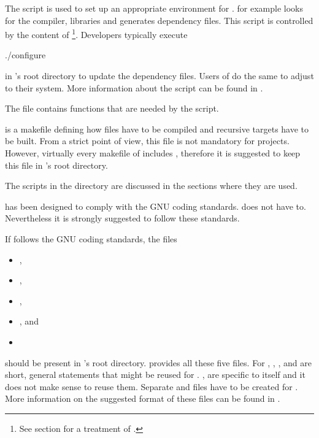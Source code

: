 The  script is used to set up an appropriate environment for \LibNewProject.  for example looks for the \Aldor compiler, libraries and generates dependency files. This script is controlled by the content of \footnote{See section  for a treatment of .}. Developers typically execute
\begin{console}
./configure
\end{console}
in \LibNewProject's root directory to update the dependency files. Users of \LibNewProject do the same to adjust \LibNewProject to their system. More information about the  script can be found in .

The file  contains functions that are needed by the  script.

 is a makefile defining how \Aldor files have to be compiled and recursive targets have to be built. From a strict point of view, this file is not mandatory for \projectname projects. However, virtually every makefile of \projectname includes , therefore it is suggested to keep this file in \LibNewProject's root directory.

The scripts in the  directory are discussed in the sections where they are used.

\projectname has been designed to comply with the GNU coding standards\cite{GNUCodingStandards}. \LibNewProject does not have to. Nevertheless it is strongly suggested to follow these standards.

If \LibNewProject follows the GNU coding standards, the files
\begin{itemize}
\item {},
\item {},
\item {},
\item {}, and
\item {}
\end{itemize}
should be present in \LibNewProject's root directory. \projectname provides all these five files. For \projectname, , , and  are short, general statements that might be reused for \LibNewProject. ,  are specific to \projectname itself and it does not make sense to reuse them. Separate  and  files have to be created for \LibNewProject. More information on the suggested format of these files can be found in \cite{GNUCodingStandards}.

